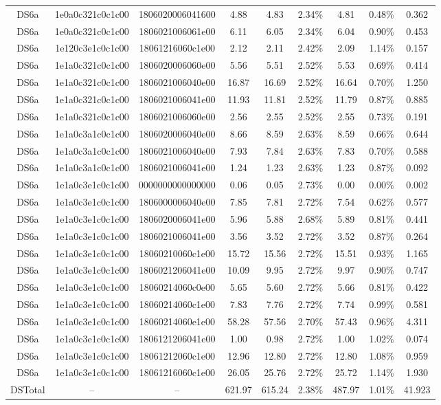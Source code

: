 \begin{tabular}{|c|c c|c|c c|c c|c|}
  DS6a & 1e0a0c321c0c1c00 & 1806020006041600 & 4.88 & 4.83 & 2.34\% & 4.81 & 0.48\% & 0.362 \\
  DS6a & 1e0a0c321c0c1c00 & 1806021006061e00 & 6.11 & 6.05 & 2.34\% & 6.04 & 0.90\% & 0.453 \\
  DS6a & 1e120c3e1c0c1c00 & 18061216060c1e00 & 2.12 & 2.11 & 2.42\% & 2.09 & 1.14\% & 0.157 \\
  DS6a & 1e1a0c321c0c1c00 & 1806020006060e00 & 5.56 & 5.51 & 2.52\% & 5.53 & 0.69\% & 0.414 \\
  DS6a & 1e1a0c321c0c1c00 & 1806021006040e00 & 16.87 & 16.69 & 2.52\% & 16.64 & 0.70\% & 1.250 \\
  DS6a & 1e1a0c321c0c1c00 & 1806021006041e00 & 11.93 & 11.81 & 2.52\% & 11.79 & 0.87\% & 0.885 \\
  DS6a & 1e1a0c321c0c1c00 & 1806021006060e00 & 2.56 & 2.55 & 2.52\% & 2.55 & 0.73\% & 0.191 \\
  DS6a & 1e1a0c3a1c0c1c00 & 1806020006040e00 & 8.66 & 8.59 & 2.63\% & 8.59 & 0.66\% & 0.644 \\
  DS6a & 1e1a0c3a1c0c1c00 & 1806021006040e00 & 7.93 & 7.84 & 2.63\% & 7.83 & 0.70\% & 0.588 \\
  DS6a & 1e1a0c3a1c0c1c00 & 1806021006041e00 & 1.24 & 1.23 & 2.63\% & 1.23 & 0.87\% & 0.092 \\
  DS6a & 1e1a0c3e1c0c1c00 & 0000000000000000 & 0.06 & 0.05 & 2.73\% & 0.00 & 0.00\% & 0.002 \\
  DS6a & 1e1a0c3e1c0c1c00 & 1806000006040e00 & 7.85 & 7.81 & 2.72\% & 7.54 & 0.62\% & 0.577 \\
  DS6a & 1e1a0c3e1c0c1c00 & 1806020006041e00 & 5.96 & 5.88 & 2.68\% & 5.89 & 0.81\% & 0.441 \\
  DS6a & 1e1a0c3e1c0c1c00 & 1806021006041e00 & 3.56 & 3.52 & 2.72\% & 3.52 & 0.87\% & 0.264 \\
  DS6a & 1e1a0c3e1c0c1c00 & 18060210060c1e00 & 15.72 & 15.56 & 2.72\% & 15.51 & 0.93\% & 1.165 \\
  DS6a & 1e1a0c3e1c0c1c00 & 1806021206041e00 & 10.09 & 9.95 & 2.72\% & 9.97 & 0.90\% & 0.747 \\
  DS6a & 1e1a0c3e1c0c1c00 & 18060214060c0e00 & 5.65 & 5.60 & 2.72\% & 5.66 & 0.81\% & 0.422 \\
  DS6a & 1e1a0c3e1c0c1c00 & 18060214060c1e00 & 7.83 & 7.76 & 2.72\% & 7.74 & 0.99\% & 0.581 \\
  DS6a & 1e1a0c3e1c0c1c00 & 18060214060e1e00 & 58.28 & 57.56 & 2.70\% & 57.43 & 0.96\% & 4.311 \\
  DS6a & 1e1a0c3e1c0c1c00 & 1806121206041e00 & 1.00 & 0.98 & 2.72\% & 1.00 & 1.02\% & 0.074 \\
  DS6a & 1e1a0c3e1c0c1c00 & 18061212060c1e00 & 12.96 & 12.80 & 2.72\% & 12.80 & 1.08\% & 0.959 \\
  DS6a & 1e1a0c3e1c0c1c00 & 18061216060c1e00 & 26.05 & 25.76 & 2.72\% & 25.72 & 1.14\% & 1.930 \\
  DSTotal & -- & -- & 621.97 & 615.24 & 2.38\% & 487.97 & 1.01\% & 41.923 \\
\hline
\end{tabular}
